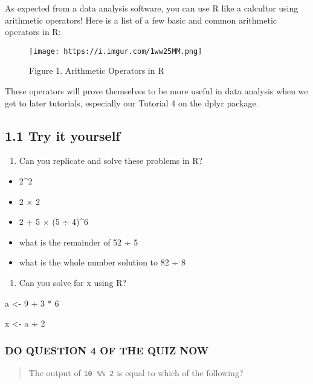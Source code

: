 \documentclass[
]{book}
\providecommand{\tightlist}{%
  \setlength{\itemsep}{0pt}\setlength{\parskip}{0pt}}
\begin{document}
As expected from a data analysis software, you can use R like a calcultor using arithmetic operators! Here is a list of a few basic and common arithmetic operators in R:

\begin{figure}
\centering
\texttt{[image: https://i.imgur.com/1ww25MM.png]}
\caption{Figure 1. Arithmetic Operators in R}
\end{figure}

These operators will prove themselves to be more useful in data analysis when we get to later tutorials, especially our Tutorial 4 on the dplyr package.

\hypertarget{try-it-yourself}{%
\subsection{1.1 Try it yourself}\label{try-it-yourself}}

\begin{enumerate}
\def\labelenumi{\alph{enumi}.}
\tightlist
\item
  Can you replicate and solve these problems in R?
\end{enumerate}

\begin{itemize}
\tightlist
\item
  2\^{}2
\item
  2 × 2
\item
  2 + 5 × (5 ÷ 4)\^{}6
\item
  what is the remainder of 52 ÷ 5
\item
  what is the whole number solution to 82 ÷ 8
\end{itemize}

\begin{enumerate}
\def\labelenumi{\alph{enumi}.}
\setcounter{enumi}{1}
\tightlist
\item
  Can you solve for x using R?
\end{enumerate}

a \textless- 9 + 3 * 6

x \textless- a ÷ 2

\hypertarget{do-question-4-of-the-quiz-now}{%
\subsubsection{DO QUESTION 4 OF THE QUIZ NOW}\label{do-question-4-of-the-quiz-now}}

\begin{quote}
The output of \texttt{10\ \%\%\ 2} is equal to which of the following?
\end{quote}
\end{document}
